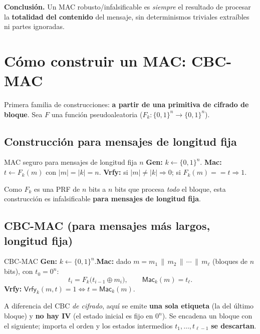 \documentclass[11pt,a4paper]{article}
\newcommand{\xor}{\oplus}
\newcommand{\concat}{\,\|\,}
\newcommand{\Mac}{\mathsf{Mac}}
\newcommand{\Vrfy}{\mathsf{Vrfy}}
\begin{document}
\begin{slidebox}
\textbf{Conclusión.} Un MAC robusto/infalsificable es \emph{siempre} el resultado de
procesar la \textbf{totalidad del contenido} del mensaje, sin determinismos triviales
extraíbles ni partes ignoradas.
\end{slidebox}

\section{Cómo construir un MAC: CBC-MAC}

Primera familia de construcciones: \textbf{a partir de una primitiva de cifrado de bloque}.
Sea $F$ una función pseudoaleatoria ($F_k:\{0,1\}^n\to\{0,1\}^n$).

\subsection{Construcción para mensajes de longitud fija}

\begin{defbox}{MAC seguro para mensajes de longitud fija $n$}
\textbf{Gen:} $k\leftarrow\{0,1\}^n$. \quad
\textbf{Mac:} $t\leftarrow F_k(m)$ con $|m|=|k|=n$. \quad
\textbf{Vrfy:} si $|m|\neq|k|\Rightarrow 0$; si $F_k(m)==t\Rightarrow 1$.
\end{defbox}

Como $F_k$ es una PRF de $n$ bits a $n$ bits que procesa \emph{todo} el bloque, esta
construcción es infalsificable \textbf{para mensajes de longitud fija}.

\subsection{CBC-MAC (para mensajes más largos, longitud fija)}

\begin{defbox}{CBC-MAC}
\textbf{Gen:} $k\leftarrow\{0,1\}^n$.\quad \textbf{Mac:} dado $m=m_1\concat m_2\concat
\cdots\concat m_\ell$ (bloques de $n$ bits), con $t_0=0^n$:
\[
  t_i = F_k\bigl(t_{i-1}\xor m_i\bigr),\qquad \Mac_k(m)=t_\ell.
\]
\textbf{Vrfy:} $\Vrfy_k(m,t)=1 \iff t=\Mac_k(m)$.
\end{defbox}

A diferencia del CBC \emph{de cifrado}, aquí se emite \textbf{una sola etiqueta} (la del
último bloque) y \textbf{no hay IV} (el estado inicial es fijo en $0^n$). Se encadena un
bloque con el siguiente; importa el orden y los estados intermedios $t_1,\dots,t_{\ell-1}$
\textbf{se descartan}.
\end{document}
